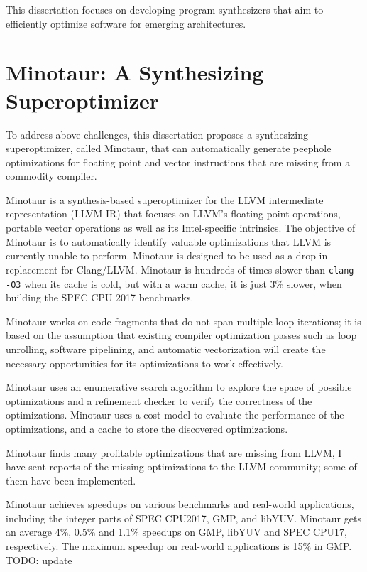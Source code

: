 This dissertation focuses on developing program synthesizers that aim
to efficiently optimize software for emerging architectures.


\section{Minotaur: A Synthesizing Superoptimizer}

To address above challenges, this dissertation proposes a synthesizing
superoptimizer, called Minotaur, that can automatically generate
peephole optimizations for floating point and vector instructions that
are missing from a commodity compiler.

Minotaur is a synthesis-based superoptimizer for the LLVM intermediate
representation (LLVM IR) that focuses on LLVM's floating point operations,
portable vector operations as well as its Intel-specific intrinsics.
The objective of Minotaur is to automatically identify valuable
optimizations that LLVM is currently unable to perform.
Minotaur is designed to be used as a drop-in replacement for Clang/LLVM.
Minotaur is hundreds of times slower than \texttt{clang -O3} when its
cache is cold, but with a warm cache, it is just 3\% slower, when
building the SPEC CPU 2017 benchmarks.

Minotaur works on code fragments that do not span multiple loop
iterations; it is based on the assumption that existing compiler
optimization passes such as loop unrolling, software pipelining, and
automatic vectorization will create the necessary opportunities for
its optimizations to work effectively.

Minotaur uses an enumerative search algorithm to explore the space of
possible optimizations and a refinement checker to verify the
correctness of the optimizations.
Minotaur uses a cost model to evaluate the performance of the
optimizations, and a cache to store the discovered optimizations.

Minotaur finds many profitable optimizations that are missing from
LLVM,
%
I have sent reports of the missing optimizations to the LLVM community;
some of them have been implemented.
%


Minotaur achieves speedups on various benchmarks and
real-world applications, including the integer parts of SPEC CPU2017,
GMP, and libYUV. Minotaur gets an average 4\%, 0.5\% and 1.1\% speedups
on GMP, libYUV and SPEC CPU17, respectively. The maximum speedup on
real-world applications is 15\% in GMP. TODO: update

